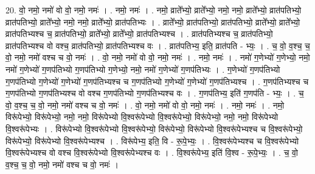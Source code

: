 \documentclass[17pt]{extarticle}
\begin{document}
20. वो॒ नमो॒ नमो॑ वो वो॒ नमो॒ नमः॑ । . नमो॒ नमः॑ । . नमो॒ व्राते᳚भ्यो॒ व्राते᳚भ्यो॒ नमो॒ नमो॒ व्राते᳚भ्यो॒ व्रात॑पतिभ्यो॒ व्रात॑पतिभ्यो॒ व्राते᳚भ्यो॒ नमो॒ नमो॒ व्राते᳚भ्यो॒ व्रात॑पतिभ्यः । . व्राते᳚भ्यो॒ व्रात॑पतिभ्यो॒ व्रात॑पतिभ्यो॒ व्राते᳚भ्यो॒ व्राते᳚भ्यो॒ व्रात॑पतिभ्यश्च च॒ व्रात॑पतिभ्यो॒ व्राते᳚भ्यो॒ व्राते᳚भ्यो॒ व्रात॑पतिभ्यश्च । . व्रात॑पतिभ्यश्च च॒ व्रात॑पतिभ्यो॒ व्रात॑पतिभ्यश्च वो वश्च॒ व्रात॑पतिभ्यो॒ व्रात॑पतिभ्यश्च वः । . व्रात॑पतिभ्य॒ इति॒ व्रात॑पति - भ्यः॒ । . च॒ वो॒ व॒श्च॒ च॒ वो॒ नमो॒ नमो॑ वश्च च वो॒ नमः॑ । . वो॒ नमो॒ नमो॑ वो वो॒ नमो॒ नमः॑ । . नमो॒ नमः॑ । . नमो॑ ग॒णेभ्यो॑ ग॒णेभ्यो॒ नमो॒ नमो॑ ग॒णेभ्यो॑ ग॒णप॑तिभ्यो ग॒णप॑तिभ्यो ग॒णेभ्यो॒ नमो॒ नमो॑ ग॒णेभ्यो॑ ग॒णप॑तिभ्यः । . ग॒णेभ्यो॑ ग॒णप॑तिभ्यो ग॒णप॑तिभ्यो ग॒णेभ्यो॑ ग॒णेभ्यो॑ ग॒णप॑तिभ्यश्च च ग॒णप॑तिभ्यो ग॒णेभ्यो॑ ग॒णेभ्यो॑ ग॒णप॑तिभ्यश्च । . ग॒णप॑तिभ्यश्च च ग॒णप॑तिभ्यो ग॒णप॑तिभ्यश्च वो वश्च ग॒णप॑तिभ्यो ग॒णप॑तिभ्यश्च वः । . ग॒णप॑तिभ्य॒ इति॑ ग॒णप॑ति - भ्यः॒ । . च॒ वो॒ व॒श्च॒ च॒ वो॒ नमो॒ नमो॑ वश्च च वो॒ नमः॑ । . वो॒ नमो॒ नमो॑ वो वो॒ नमो॒ नमः॑ । . नमो॒ नमः॑ । . नमो॒ विरू॑पेभ्यो॒ विरू॑पेभ्यो॒ नमो॒ नमो॒ विरू॑पेभ्यो वि॒श्वरू॑पेभ्यो वि॒श्वरू॑पेभ्यो॒ विरू॑पेभ्यो॒ नमो॒ नमो॒ विरू॑पेभ्यो वि॒श्वरू॑पेभ्यः । . विरू॑पेभ्यो वि॒श्वरू॑पेभ्यो वि॒श्वरू॑पेभ्यो॒ विरू॑पेभ्यो॒ विरू॑पेभ्यो वि॒श्वरू॑पेभ्यश्च च वि॒श्वरू॑पेभ्यो॒ विरू॑पेभ्यो॒ विरू॑पेभ्यो वि॒श्वरू॑पेभ्यश्च । . विरू॑पेभ्य॒ इति॒ वि - रू॒पे॒भ्यः॒ । . वि॒श्वरू॑पेभ्यश्च च वि॒श्वरू॑पेभ्यो वि॒श्वरू॑पेभ्यश्च वो वश्च वि॒श्वरू॑पेभ्यो वि॒श्वरू॑पेभ्यश्च वः । . वि॒श्वरू॑पेभ्य॒ इति॑ वि॒श्व - रू॒पे॒भ्यः॒ । . च॒ वो॒ व॒श्च॒ च॒ वो॒ नमो॒ नमो॑ वश्च च वो॒ नमः॑ । \newline
\end{document}
